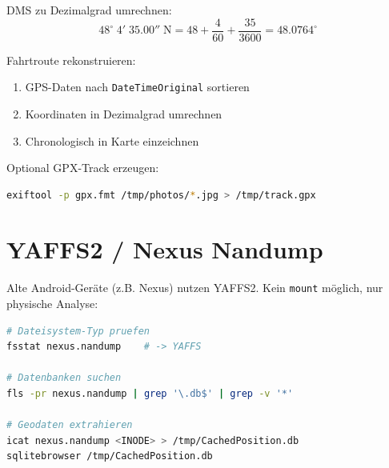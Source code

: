 DMS zu Dezimalgrad umrechnen:
$$48^\circ\;4'\;35.00''\;\text{N} = 48 + \frac{4}{60} + \frac{35}{3600} = 48.0764^\circ$$

Fahrtroute rekonstruieren:
\begin{enumerate}
	\item GPS-Daten nach \texttt{DateTimeOriginal} sortieren
	\item Koordinaten in Dezimalgrad umrechnen
	\item Chronologisch in Karte einzeichnen
\end{enumerate}

Optional GPX-Track erzeugen:

\begin{lstlisting}[language=bash]
exiftool -p gpx.fmt /tmp/photos/*.jpg > /tmp/track.gpx
\end{lstlisting}

\section{YAFFS2 / Nexus Nandump}

Alte Android-Geräte (z.B. Nexus) nutzen YAFFS2.
Kein \texttt{mount} möglich, nur physische Analyse:

\begin{lstlisting}[language=bash]
# Dateisystem-Typ pruefen
fsstat nexus.nandump    # -> YAFFS

# Datenbanken suchen
fls -pr nexus.nandump | grep '\.db$' | grep -v '*'

# Geodaten extrahieren
icat nexus.nandump <INODE> > /tmp/CachedPosition.db
sqlitebrowser /tmp/CachedPosition.db
\end{lstlisting}
